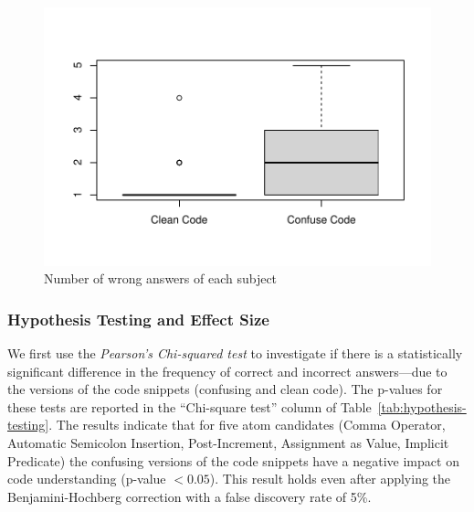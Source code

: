 \begin{figure}[htb!]
\noindent
 \centering
 \includegraphics[width=\columnwidth]{images/wrong-answers-plot-1.pdf}
 \caption{Number of wrong answers of each subject}
 \label{fig:boxplotcorrectness}
 \end{figure}


\subsubsection*{Hypothesis Testing and Effect Size}

We first use the \emph{Pearson's Chi-squared test}
to investigate if there is a statistically significant difference in the frequency of correct and incorrect answers---due to the versions of the code snippets (confusing and clean code). The p-values for these tests are reported in the ``Chi-square test'' column of Table~\ref{tab:hypothesis-testing}. The results indicate that for five atom candidates (Comma Operator, Automatic Semicolon Insertion, Post-Increment, Assignment as Value, Implicit Predicate) the confusing versions of the code snippets have a negative impact on code understanding (p-value $< 0.05$). This result holds even after applying the Benjamini-Hochberg correction with a false discovery rate of 5\%. 

